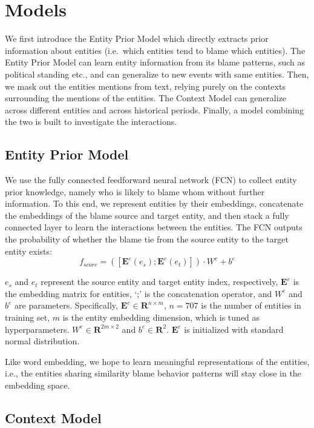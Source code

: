 \documentclass[letterpaper]{article}
\begin{document}
\section{Models}

We first introduce the Entity Prior Model which directly extracts prior information about entities (i.e.\ which entities tend to blame which entities). The Entity Prior Model can learn entity information from its blame patterns, such as political standing etc., and can generalize to new events with same entities. Then, we mask out the entities mentions from text, relying purely on the contexts surrounding the mentions of the entities. The Context Model can generalize across different entities and across historical periods. Finally, a model combining the two is built to investigate the interactions.

\subsection{Entity Prior Model}
\label{entitymodel}
We use the fully connected feedforward neural network (FCN) to collect entity prior knowledge, namely who is likely to blame whom without further information. To this end, we represent entities by their embeddings, concatenate the embeddings of the blame source and target entity, and then stack a fully connected layer to learn the interactions between the entities. The FCN outputs the probability of whether the blame tie from the source entity to the target entity exists: $$f_{score} = ([\mathbf{E}^e(e_s); \mathbf{E}^e(e_t)]) \cdot W^e + b^e $$

$e_s$ and $e_t$ represent the source entity and target entity index, respectively, $\mathbf{E}^e$ is the embedding matrix for entities, `;' is the concatenation operator, and $W^e$ and $b^e$ are parameters. Specifically, $\mathbf{E}^e \in \mathbf{R}^{n\times m}$, $n=707$ is the number of entities in training set, $m$ is the entity embedding dimension, which is tuned as hyperparameters. $W^e \in \mathbf{R}^{2m\times 2}$ and $b^e \in \mathbf{R}^{2} $. $\mathbf{E}^e$ is initialized with standard normal distribution.

Like word embedding, we hope to learn meaningful representations of the entities, i.e., the entities sharing similarity blame behavior patterns will stay close in the embedding space.

\subsection{Context Model}
\label{contextmodel}
\end{document}
